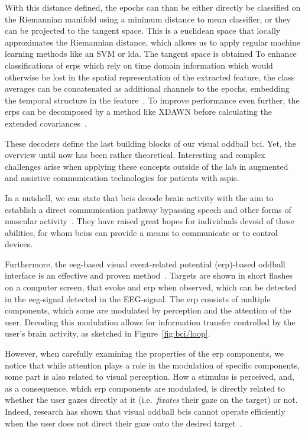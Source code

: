 With this distance defined, the epochs can than be either directly be
classified on the Riemannian manifold using a minimum distance to mean
classifier, or they can be projected to the tangent space.
This is a euclidean space that locally approximates the Riemannian distance,
which allows us to apply regular machine learning methods like an SVM or
\ac{lda}.
The tangent space is obtained
To enhance classifications of \ac{erps} which rely on time domain information
which would otherwise be lost in the spatial representation of the extracted
feature, the class averages can be concatenated as additional channels to the
epochs, embedding the temporal structure in the feature~\cite{Barachant2014}.
To improve performance even further, the \acp{erp} can be decomposed by a method
like XDAWN before calculating the extended covariances~\cite{Li2020}.

These decoders define the last building blocks of our visual oddball \ac{bci}.
Yet, the overview until now has been rather theoretical.
Interesting and complex challenges arise when applying these concepts outside
of the lab in augmented and assistive communication technologies for patients
with \acp{sspi}.


In a nutshell, we can state that \acp{bci} decode brain activity with the aim to
establish a direct communication pathway bypassing speech and other forms of
muscular activity~\cite{Naci2012,Chaudhary2016}.
They have raised great hopes for individuals devoid of these abilities, for whom
\acp{bci}s can provide a means to communicate or to
control devices.

Furthermore, the \ac{eeg}-based visual event-related potential (\ac{erp})-based
oddball interface is an effective and proven method~\cite{Wolpaw2018,Severens2020}.
Targets are shown in short flashes on a computer screen, that evoke
and \ac{erp} when observed, which can be detected in the \ac{eeg}-signal
detected in the EEG-signal.
The \ac{erp} consists of multiple components, which some are modulated by
perception and the attention of the user.
Decoding this modulation allows for information transfer controlled by the
user's brain activity, as sketched in Figure~\ref{fig:bci/loop}.

However, when carefully examining the properties of the \ac{erp} components,
we notice that while attention plays a role in the modulation of specific components,
some part is also related to visual perception.
How a stimulus is perceived, and, as a consequence, which \ac{erp} components
are modulated, is directly related to whether the user gazes directly at it
(i.e.\ \emph{fixates} their gaze on the target) or not.
Indeed, research has shown that visual oddball \ac{bci}s cannot operate
efficiently when the user does not direct
their gaze onto the desired target~\cite{Brunner2010, Frenzel2011}.

